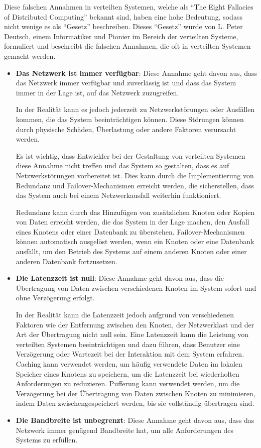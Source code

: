 Diese falschen Annahmen in verteilten Systemen, welche als \enquote{The Eight Fallacies of Distributed Computing} bekannt sind, haben eine hohe Bedeutung, sodass nicht wenige es als \enquote{Gesetz} beschreiben. Dieses \enquote{Gesetz} wurde von L. Peter Deutsch, einem Informatiker und Pionier im Bereich der verteilten Systeme, formuliert und beschreibt die falschen Annahmen, die oft in verteilten Systemen gemacht werden. 
\begin{itemize}  
\item \textbf{Das Netzwerk ist immer verfügbar}: Diese Annahme geht davon aus, dass das Netzwerk immer verfügbar und zuverlässig ist und dass das System immer in der Lage ist, auf das Netzwerk zuzugreifen.

In der Realität kann es jedoch jederzeit zu Netzwerkstörungen oder Ausfällen kommen, die das System beeinträchtigen können. Diese Störungen können durch physische Schäden, Überlastung oder andere Faktoren verursacht werden.

Es ist wichtig, dass Entwickler bei der Gestaltung von verteilten Systemen diese Annahme nicht treffen und das System so gestalten, dass es auf Netzwerkstörungen vorbereitet ist. Dies kann durch die Implementierung von Redundanz und Failover-Mechanismen erreicht werden, die sicherstellen, dass das System auch bei einem Netzwerkausfall weiterhin funktioniert.

Redundanz kann durch das Hinzufügen von zusätzlichen Knoten oder Kopien von Daten erreicht werden, die das System in der Lage machen, den Ausfall eines Knotens oder einer Datenbank zu überstehen. Failover-Mechanismen können automatisch ausgelöst werden, wenn ein Knoten oder eine Datenbank ausfällt, um den Betrieb des Systems auf einem anderen Knoten oder einer anderen Datenbank fortzusetzen.

\item \textbf{Die Latenzzeit ist null}: Diese Annahme geht davon aus, dass die Übertragung von Daten zwischen verschiedenen Knoten im System sofort und ohne Verzögerung erfolgt.

In der Realität kann die Latenzzeit jedoch aufgrund von verschiedenen Faktoren wie der Entfernung zwischen den Knoten, der Netzwerklast und der Art der Übertragung nicht null sein. Eine Latenzzeit kann die Leistung von verteilten Systemen beeinträchtigen und dazu führen, dass Benutzer eine Verzögerung oder Wartezeit bei der Interaktion mit dem System erfahren.
Caching kann verwendet werden, um häufig verwendete Daten im lokalen Speicher eines Knotens zu speichern, um die Latenzzeit bei wiederholten Anforderungen zu reduzieren. Pufferung kann verwendet werden, um die Verzögerung bei der Übertragung von Daten zwischen Knoten zu minimieren, indem Daten zwischengespeichert werden, bis sie vollständig übertragen sind.
\item \textbf{Die Bandbreite ist unbegrenzt}: Diese Annahme geht davon aus, dass das Netzwerk immer genügend Bandbreite hat, um alle Anforderungen des Systems zu erfüllen.


\end{itemize}

